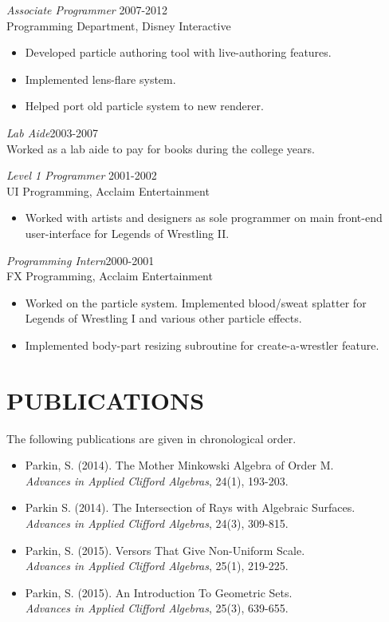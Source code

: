 \documentclass[margin]{res}
\begin{document}
\begin{resume}
                {\sl Associate Programmer} \hfill 2007-2012 \\
		Programming Department, Disney Interactive
                 \begin{itemize}  \itemsep -2pt %
		\item Developed particle authoring tool with live-authoring features.
		\item Implemented lens-flare system.
		\item Helped port old particle system to new renderer.
                 \end{itemize} 

		{\sl Lab Aide}\hfill 2003-2007 \\
		Worked as a lab aide to pay for books during the college years.

                {\sl Level 1 Programmer} \hfill 2001-2002 \\
		UI Programming, Acclaim Entertainment
                  \begin{itemize}\itemsep -2pt %
                   \item Worked with artists and designers as sole programmer on main front-end user-interface for Legends of Wrestling II.
                   \end{itemize} 

		{\sl Programming Intern}\hfill 2000-2001 \\
		FX Programming, Acclaim Entertainment
		\begin{itemize}\itemsep -2pt %
		\item Worked on the particle system.  Implemented blood/sweat splatter for Legends of Wrestling I and various other particle effects.
		\item Implemented body-part resizing subroutine for create-a-wrestler feature.
		\end{itemize}

\pagebreak
\section{PUBLICATIONS}
		The following publications are given in chronological order.
		\begin{itemize}\itemsep -2pt %
		\item Parkin, S. (2014).  The Mother Minkowski Algebra of Order M.\\{\it Advances in Applied Clifford Algebras}, 24(1), 193-203.
		\item Parkin S.  (2014).  The Intersection of Rays with Algebraic Surfaces.\\{\it Advances in Applied Clifford Algebras}, 24(3), 309-815.
		\item Parkin, S.  (2015).  Versors That Give Non-Uniform Scale.\\{\it Advances in Applied Clifford Algebras}, 25(1), 219-225.
		\item Parkin, S.  (2015).  An Introduction To Geometric Sets.\\{\it Advances in Applied Clifford Algebras}, 25(3), 639-655.
		

\end{itemize}
\end{resume}
\end{document}
